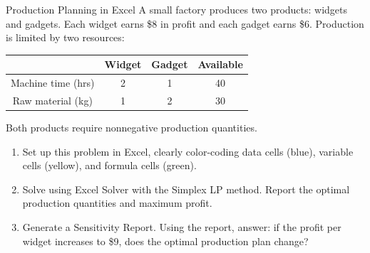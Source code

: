 \begin{ex}{Production Planning in Excel}{}
\label{ex:excel-production-planning}
 A small factory produces two products: widgets and gadgets.  Each widget earns \$8 in profit and each gadget earns \$6.  Production is limited by two resources:

\begin{center}
\begin{tabular}{c|c|c|c}
 & \textbf{Widget} & \textbf{Gadget} & \textbf{Available} \\
\hline
Machine time (hrs) & 2 & 1 & 40 \\
Raw material (kg) & 1 & 2 & 30 \\
\end{tabular}
\par{}\label{tab:software-excel-tab02}%

\end{center}

Both products require nonnegative production quantities.

\begin{enumerate}
\item Set up this problem in Excel, clearly color-coding data cells (blue), variable cells (yellow), and formula cells (green).
\item Solve using Excel Solver with the Simplex LP method. Report the optimal production quantities and maximum profit.
\item Generate a Sensitivity Report.  Using the report, answer: if the profit per widget increases to \$9, does the optimal production plan change?
\end{enumerate}
\exrefs{\S\ref{sec:excel-solver}}
\end{ex}

